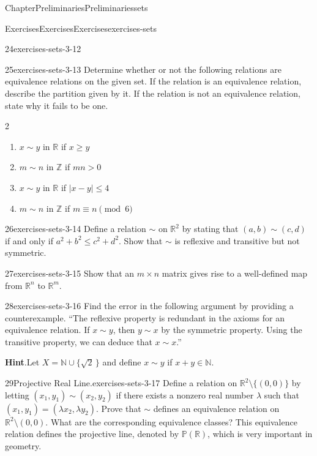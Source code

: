 \documentclass[oneside,10pt,]{book}
\newcommand{\blocktitlefont}{\relax}
\numberwithin{equation}{section}
\begin{document}
\begin{chapterptx}{Chapter}{Preliminaries}{}{Preliminaries}{}{}{sets}
\begin{exercises-section}{Exercises}{Exercises}{}{Exercises}{}{}{exercises-sets}
\begin{divisionexercise}{24}{}{}{exercises-sets-3-12}
\end{divisionexercise}%
\begin{divisionexercise}{25}{}{}{exercises-sets-3-13}%
Determine whether or not the following relations are equivalence relations on the given set.  If the relation is an equivalence relation, describe the partition given by it.  If the relation is not an equivalence relation, state why it fails to be one.%
%
\begin{multicols}{2}
\begin{enumerate}[label={(\alph*)}]
\item{}\(x \sim y\) in \({\mathbb R}\) if \(x \geq y\)%
\item{}\(m \sim n\) in \({\mathbb Z}\) if \(mn > 0\)%
\item{}\(x \sim y\) in \({\mathbb R}\) if \(|x - y| \leq 4\)%
\item{}\(m \sim n\) in \({\mathbb Z}\) if \(m \equiv n \pmod{6}\)%
\end{enumerate}
\end{multicols}
\end{divisionexercise}%
\begin{divisionexercise}{26}{}{}{exercises-sets-3-14}%
Define a relation \(\sim\) on \({\mathbb R}^2\) by stating that \((a, b) \sim (c, d)\) if and only if \(a^2 + b^2 \leq c^2 + d^2\). Show that \(\sim\) is reflexive and transitive but not symmetric.%
\end{divisionexercise}%
\begin{divisionexercise}{27}{}{}{exercises-sets-3-15}%
Show that an \(m \times n\) matrix gives rise to a well-defined  map from \({\mathbb R}^n\) to \({\mathbb R}^m\).%
\end{divisionexercise}%
\begin{divisionexercise}{28}{}{}{exercises-sets-3-16}%
Find the error in the following argument by providing a counterexample. ``The reflexive property is redundant in the axioms for an equivalence relation.  If \(x \sim y\), then \(y \sim x\) by the symmetric property.  Using the transitive property, we can deduce that \(x \sim x\).''%
\par\smallskip%
\noindent\textbf{\blocktitlefont Hint}.\hypertarget{exercises-sets-3-16-2}{}\quad{}Let \(X = {\mathbb N} \cup \{ \sqrt{2}\, \}\) and define \(x \sim y\) if \(x + y \in {\mathbb N}\).%
\end{divisionexercise}%
\begin{divisionexercise}{29}{Projective Real Line.}{}{exercises-sets-3-17}%
Define a relation on \({\mathbb R}^2 \setminus  \{ (0,0) \}\) by letting \((x_1, y_1) \sim (x_2, y_2)\) if there exists a nonzero real number \(\lambda\) such that \((x_1, y_1)  = ( \lambda x_2, \lambda y_2)\).  Prove that \(\sim\) defines an equivalence relation on \({\mathbb R}^2 \setminus (0,0)\).  What are the corresponding  equivalence classes?  This equivalence relation defines the projective line, denoted by  \({\mathbb P}({\mathbb R}) \), which is very important in geometry.%

\end{divisionexercise}
\end{exercises-section}
\end{chapterptx}
\end{document}
